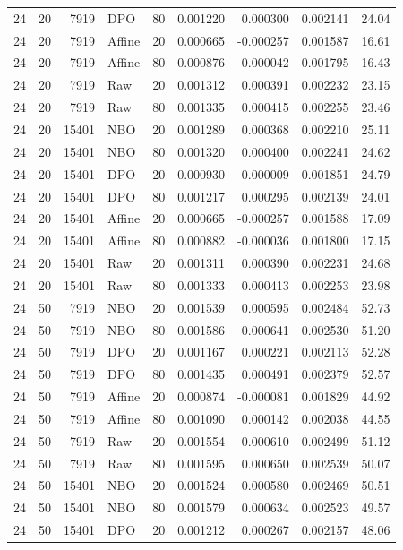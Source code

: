\begin{longtable}{lrrlrrrrr}
24 & 20 & 7919 & DPO & 80 & 0.001220 & 0.000300 & 0.002141 & 24.04\\
24 & 20 & 7919 & Affine & 20 & 0.000665 & -0.000257 & 0.001587 & 16.61\\
24 & 20 & 7919 & Affine & 80 & 0.000876 & -0.000042 & 0.001795 & 16.43\\
24 & 20 & 7919 & Raw & 20 & 0.001312 & 0.000391 & 0.002232 & 23.15\\
24 & 20 & 7919 & Raw & 80 & 0.001335 & 0.000415 & 0.002255 & 23.46\\
24 & 20 & 15401 & NBO & 20 & 0.001289 & 0.000368 & 0.002210 & 25.11\\
24 & 20 & 15401 & NBO & 80 & 0.001320 & 0.000400 & 0.002241 & 24.62\\
24 & 20 & 15401 & DPO & 20 & 0.000930 & 0.000009 & 0.001851 & 24.79\\
24 & 20 & 15401 & DPO & 80 & 0.001217 & 0.000295 & 0.002139 & 24.01\\
24 & 20 & 15401 & Affine & 20 & 0.000665 & -0.000257 & 0.001588 & 17.09\\
24 & 20 & 15401 & Affine & 80 & 0.000882 & -0.000036 & 0.001800 & 17.15\\
24 & 20 & 15401 & Raw & 20 & 0.001311 & 0.000390 & 0.002231 & 24.68\\
24 & 20 & 15401 & Raw & 80 & 0.001333 & 0.000413 & 0.002253 & 23.98\\
24 & 50 & 7919 & NBO & 20 & 0.001539 & 0.000595 & 0.002484 & 52.73\\
24 & 50 & 7919 & NBO & 80 & 0.001586 & 0.000641 & 0.002530 & 51.20\\
24 & 50 & 7919 & DPO & 20 & 0.001167 & 0.000221 & 0.002113 & 52.28\\
24 & 50 & 7919 & DPO & 80 & 0.001435 & 0.000491 & 0.002379 & 52.57\\
24 & 50 & 7919 & Affine & 20 & 0.000874 & -0.000081 & 0.001829 & 44.92\\
24 & 50 & 7919 & Affine & 80 & 0.001090 & 0.000142 & 0.002038 & 44.55\\
24 & 50 & 7919 & Raw & 20 & 0.001554 & 0.000610 & 0.002499 & 51.12\\
24 & 50 & 7919 & Raw & 80 & 0.001595 & 0.000650 & 0.002539 & 50.07\\
24 & 50 & 15401 & NBO & 20 & 0.001524 & 0.000580 & 0.002469 & 50.51\\
24 & 50 & 15401 & NBO & 80 & 0.001579 & 0.000634 & 0.002523 & 49.57\\
24 & 50 & 15401 & DPO & 20 & 0.001212 & 0.000267 & 0.002157 & 48.06\\

\end{longtable}
